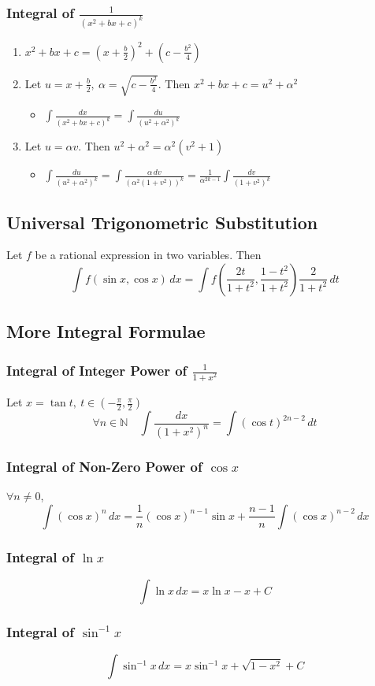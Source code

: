 \documentclass[../ma2002_notes.tex]{subfiles}
\begin{document}
\subsubsection{Integral of $\frac{1}{(x^2+bx+c)^k}$}
\begin{enumerate}
	\item\(x^2+bx+c=(x+\frac{b}{2})^2+(c-\frac{b^2}{4})\)
	\item Let \(u=x+\frac{b}{2},\ \alpha=\sqrt{c-\frac{b^2}{4}}\). Then \(x^2+bx+c=u^2+\alpha^2\)
	\begin{itemize}
		\item\(\displaystyle\int\frac{dx}{(x^2+bx+c)^k}=\int\frac{du}{(u^2+\alpha^2)^k}\)
	\end{itemize}
	\item Let \(u=\alpha v\). Then \(u^2+\alpha^2=\alpha^2(v^2+1)\)
	\begin{itemize}
		\item\(\displaystyle\int\frac{du}{(u^2+\alpha^2)^k}=\int\frac{\alpha\,dv}{(\alpha^2(1+v^2))^k}=\frac{1}{\alpha^{2k-1}}\int\frac{dv}{(1+v^2)^k}\)
	\end{itemize}
\end{enumerate}

\subsection{Universal Trigonometric Substitution}
Let \(f\) be a rational expression in two variables. Then
\[\int f(\sin x,\cos x)\,dx=\int f\left(\frac{2t}{1+t^2},\frac{1-t^2}{1+t^2}\right)\frac{2}{1+t^2}\,dt\]

\subsection{More Integral Formulae}
\subsubsection{Integral of Integer Power of $\frac{1}{1+x^2}$}
Let \(x=\tan t,\ t\in(-\frac{\pi}{2},\frac{\pi}{2})\)
\[\forall n\in\mathbb{N}\quad\int\frac{dx}{(1+x^2)^n}=\int(\cos t)^{2n-2}\,dt\]

\subsubsection{Integral of Non-Zero Power of $\cos x$}
\(\forall n\ne0\),
\[\int(\cos x)^n\,dx=\frac{1}{n}(\cos x)^{n-1}\sin x+\frac{n-1}{n}\int(\cos x)^{n-2}\,dx\]

\subsubsection{Integral of $\ln x$}
\[\int\ln x\,dx=x\ln x-x+C\]

\subsubsection{Integral of $\sin^{-1}x$}
\[\int\sin^{-1}x\,dx=x\sin^{-1}x+\sqrt{1-x^2}+C\]
\end{document}
